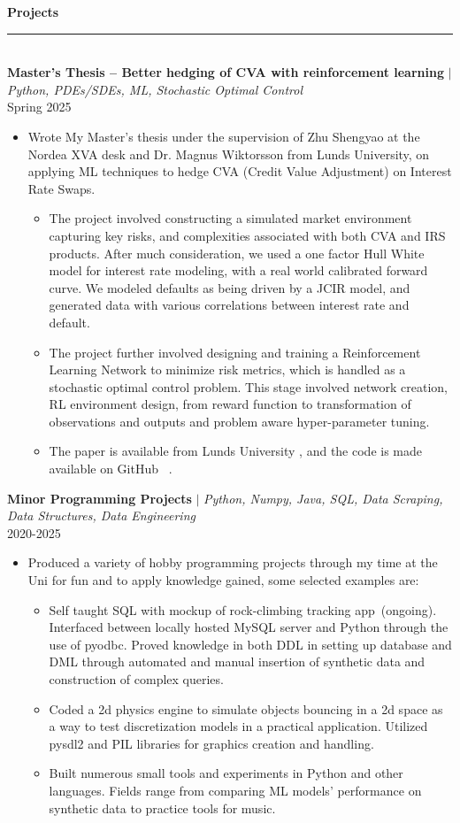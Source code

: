 \documentclass[10pt, a4paper, english]{article}
\newcommand{\smallgit}[1]{~\href{#1}{\faGithub} }
\def\MastersTitle{Master's Thesis -- Better hedging of CVA with reinforcement learning}%
\newcommand{\mysection}[1]{\color{black}\textbf{\LARGE{#1}}\\
				        \rule[1em]{\widthof{\textbf{\LARGE{#1}}}}{1.333pt} \color{darkgray!80!black}\\ \vspace{-1em}}
\newcommand{\PExperience}[3]{\normalsize \noindent \textbf{#1} $\vert$ \textit{\footnotesize#3} \hfil \\ #2 \vspace{-0.25em}}
\begin{document}
\newpage
{}
\raggedright
\mysection{Projects}
\PExperience{\MastersTitle}{Spring 2025}{Python, PDEs/SDEs, ML, Stochastic Optimal Control}
\begin{itemize}
\item Wrote My Master's thesis under the supervision of Zhu Shengyao at the Nordea XVA desk and Dr. Magnus Wiktorsson from Lunds University, on applying ML techniques to hedge CVA (Credit Value Adjustment) on Interest Rate Swaps.
	\begin{itemize} 
		\item The project involved constructing a simulated market environment capturing key risks, and complexities associated with both CVA and IRS products. After much consideration, we used a one factor Hull White model for interest rate 		modeling, with a real world calibrated forward curve. We modeled defaults as being driven by a JCIR model, and generated data with various correlations between interest rate and default.
		\item The project further involved designing and training a Reinforcement Learning Network to minimize risk metrics, which is handled as a stochastic optimal control problem. This stage involved network creation, RL environment design, from reward function to transformation of observations and outputs and problem aware hyper-parameter tuning.
		\item The paper is available from Lunds University \href{http://lup.lub.lu.se/student-papers/record/9197473}{ \scriptsize \faLink}, and the code is made available on GitHub\smallgit{https://github.com/Squid-oid/cva_risk_management_thesisn}.
	\end{itemize}
\end{itemize}

\PExperience{Minor Programming Projects}{2020-2025}{Python, Numpy, Java, SQL, Data Scraping, Data Structures, Data Engineering}
\begin{itemize}
\item Produced a variety of hobby programming projects through my time at the Uni for fun and to apply knowledge gained, some selected examples are:
	\begin{itemize}\normalsize 
		\item Self taught SQL with mockup of rock-climbing tracking app~(ongoing). Interfaced between locally hosted MySQL server and Python through the use of pyodbc. Proved knowledge in both DDL in setting up database and DML through 				automated and manual insertion of synthetic data and construction of complex queries. \smallgit{https://github.com/Squid-oid/SQL}
		\item Coded a 2d physics engine to simulate objects bouncing in a 2d space as a way to test discretization models in a practical application. Utilized pysdl2 and PIL libraries for graphics creation and handling. \smallgit{https://github.com/Squid-oid/physics-fun}
		\item Built numerous small tools and experiments in Python and other languages. Fields range from comparing ML models' performance on synthetic data to practice tools for music.
	\end{itemize}
\end{itemize}
\end{document}
